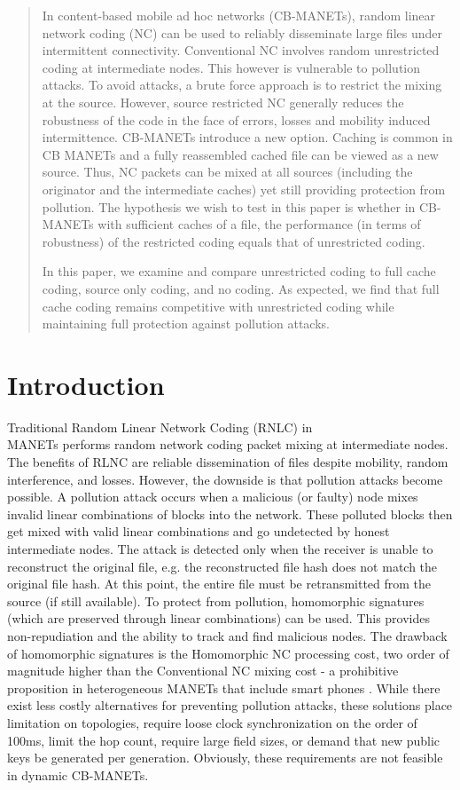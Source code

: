 \begin{abstract}
In content-based mobile ad hoc networks (CB-MANETs), random linear network coding (NC) can be used to reliably disseminate large files under intermittent connectivity. Conventional NC involves random unrestricted coding at intermediate nodes. This however is vulnerable to pollution attacks. To avoid attacks, a brute force approach is to restrict the mixing at the source. However, source restricted NC generally reduces the robustness of the code in the face of errors, losses and mobility induced intermittence. CB-MANETs introduce a new option. Caching is common in CB MANETs and a fully reassembled cached file can be viewed as a new source. Thus, NC packets can be mixed at all sources (including the originator and the intermediate caches) yet still providing protection from pollution. The hypothesis we wish to test in this paper is whether in CB-MANETs with sufficient caches of a file, the performance (in terms of robustness) of the restricted coding equals that of unrestricted coding.  

In this paper, we examine and compare unrestricted coding to full cache coding, source only coding, and no coding. As expected, we find that full cache coding remains competitive with unrestricted coding while maintaining full protection against pollution attacks.
\end{abstract}

\section{Introduction}
Traditional Random Linear Network Coding (RNLC) in \\MANETs performs random network coding packet mixing at intermediate nodes. The benefits of RLNC are reliable dissemination of files despite mobility, random interference, and losses. However, the downside is that pollution attacks become possible. A pollution attack occurs when a malicious (or faulty) node mixes invalid linear combinations of blocks into the network. These polluted blocks then get mixed with valid linear combinations and go undetected by honest intermediate nodes. The attack is detected only when the receiver is unable to reconstruct the original file, e.g. the reconstructed file hash does not match the original file hash. At this point, the entire file must be retransmitted from the source (if still available). To protect from pollution, homomorphic signatures (which are preserved through linear combinations) can be used. This provides non-repudiation and the ability to track and find malicious nodes. The drawback of homomorphic signatures is the Homomorphic NC processing cost, two order of  magnitude higher than the Conventional NC mixing cost - a prohibitive proposition in heterogeneous MANETs that include smart phones \cite{5978945}. While there exist less costly alternatives for preventing pollution attacks, these solutions place  limitation on topologies, require loose clock synchronization on the order of 100ms, limit the hop count, require large field sizes, or demand that new public keys be generated per generation. Obviously, these requirements are not feasible in dynamic CB-MANETs. 


